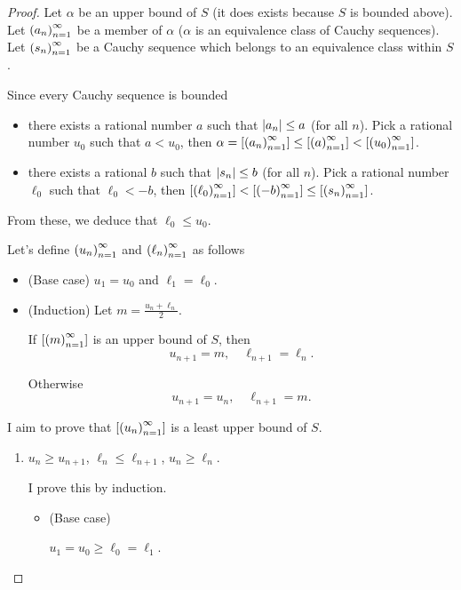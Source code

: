 \begin{proof}
    Let $\alpha$ be an upper bound of $S$ (it does exists because $S$ is bounded above). Let ${\left({a_{n}}\right)}^{\infty}_{n=1}$ be a member of $\alpha$ ($\alpha$ is an equivalence class of Cauchy sequences). Let ${\left({s_{n}}\right)}^{\infty}_{n=1}$ be a Cauchy sequence which belongs to an equivalence class within $S$.

    Since every Cauchy sequence is bounded
    \begin{itemize}
        \item there exists a rational number $a$ such that $\left\vert{a_{n}}\right\vert\le a$ (for all $n$). Pick a rational number $u_{0}$ such that $a < u_{0}$, then $\alpha = \left[{{\left({a_{n}}\right)}^{\infty}_{n=1}}\right] \le \left[{{\left({a}\right)}^{\infty}_{n=1}}\right] < \left[{{\left({u_{0}}\right)}^{\infty}_{n=1}}\right]$.
        \item there exists a rational $b$ such that $\left\vert{s_{n}}\right\vert\le b$ (for all $n$). Pick a rational number $\ell_{0}$ such that $\ell_{0} < -b$, then $\left[{{\left({\ell_{0}}\right)}^{\infty}_{n=1}}\right] < \left[{{\left({-b}\right)}^{\infty}_{n=1}}\right]\le\left[{{\left({s_{n}}\right)}^{\infty}_{n=1}}\right]$.
    \end{itemize}

    From these, we deduce that $\ell_{0}\le u_{0}$.

    Let's define ${\left({u_{n}}\right)}^{\infty}_{n=1}$ and ${\left({\ell_{n}}\right)}^{\infty}_{n=1}$ as follows
    \begin{itemize}
        \item (Base case) $u_{1} = u_{0}$ and $\ell_{1} = \ell_{0}$.
        \item (Induction) Let $m = \frac{u_{n} + \ell_{n}}{2}$.

              If $\left[{{\left({m}\right)}^{\infty}_{n=1}}\right]$ is an upper bound of $S$, then
              \[
                  u_{n+1} = m,\quad \ell_{n+1} = \ell_{n}.
              \]

              Otherwise
              \[
                  u_{n+1} = u_{n},\quad \ell_{n+1} = m.
              \]
    \end{itemize}

    I aim to prove that $\left[{{\left({u_{n}}\right)}^{\infty}_{n=1}}\right]$ is a least upper bound of $S$.

    \begin{enumerate}[label={\textbf{Step \arabic*.}},itemindent=1cm]
        \item $u_{n}\ge u_{n+1}$, $\ell_{n}\le\ell_{n+1}$, $u_{n}\ge\ell_{n}$.

              I prove this by induction.
              \begin{itemize}
                  \item (Base case)

                        $u_{1} = u_{0}\ge \ell_{0} = \ell_{1}$.


\end{itemize}
\end{enumerate}
\end{proof}
